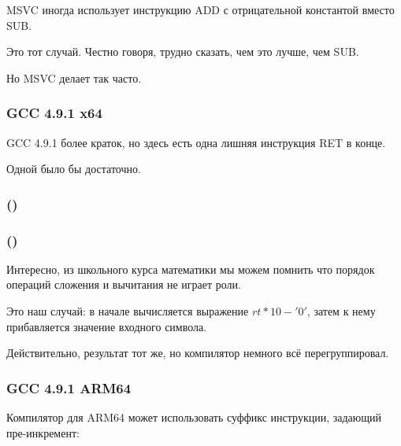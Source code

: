 MSVC иногда использует инструкцию ADD с отрицательной константой вместо SUB.

Это тот случай.
Честно говоря, трудно сказать, чем это лучше, чем SUB.

Но MSVC делает так часто.

\subsubsection{\Optimizing GCC 4.9.1 x64}

\Optimizing GCC 4.9.1 более краток, но здесь есть одна лишняя инструкция RET в конце.

Одной было бы достаточно.



\subsubsection{\OptimizingKeilVI (\ARMMode)}



\subsubsection{\OptimizingKeilVI (\ThumbMode)}



Интересно, из школьного курса математики мы можем помнить что порядок операций сложения и вычитания
не играет роли.

Это наш случай: в начале вычисляется выражение $rt*10 - '0'$, затем к нему прибавляется 
значение входного символа.

Действительно, результат тот же, но компилятор немного всё перегруппировал.

\subsubsection{\Optimizing GCC 4.9.1 ARM64}

Компилятор для ARM64 может использовать суффикс инструкции, задающий пре-инкремент:



